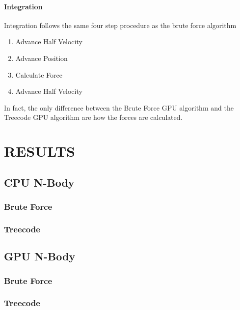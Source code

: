 \documentclass{thesis}
\begin{document}
\subsubsection{Integration}
Integration follows the same four step procedure as the brute force algorithm
\begin{enumerate}[noitemsep]
    \item Advance Half Velocity
    \item Advance Position
    \item Calculate Force
    \item Advance Half Velocity
\end{enumerate}
In fact, the only difference between the Brute Force GPU algorithm and the Treecode GPU algorithm are how the forces are calculated. 
\chapter{RESULTS}
\section{CPU N-Body}
\subsection{Brute Force}
\subsection{Treecode}
\section{GPU N-Body}
\subsection{Brute Force}
\subsection{Treecode}
\end{document}
